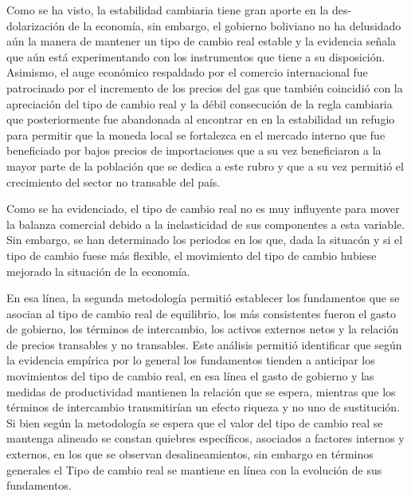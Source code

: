 \documentclass[12pt,letterpaper]{article}
\begin{document}
Como se ha visto, la estabilidad cambiaria tiene gran aporte en la des-dolarización de la economía, sin embargo, el gobierno boliviano no ha delusidado aún la manera de mantener un tipo de cambio real estable y la evidencia señala que aún está experimentando con los instrumentos que tiene a su disposición. Asimismo, el auge económico respaldado por el comercio internacional fue patrocinado por el incremento de los precios del gas que también coincidió con la apreciación del tipo de cambio real y la débil consecución de la regla cambiaria que posteriormente fue abandonada al encontrar en en la estabilidad un refugio para permitir que la moneda local se fortalezca en el mercado interno que fue beneficiado por bajos precios de importaciones que a su vez beneficiaron a la mayor parte de la población que se dedica a este rubro y que a su vez permitió el crecimiento del sector no transable del país.


Como se ha evidenciado, el tipo de cambio real no es muy influyente para mover la balanza comercial debido a la inelasticidad de sus componentes a esta variable. Sin embargo, se han determinado los periodos en los que, dada la situacón y si el tipo de cambio fuese más flexible, el movimiento del tipo de cambio hubiese mejorado la situación de la economía.



En esa línea, la segunda metodología permitió establecer los fundamentos que se asocian al tipo de cambio real de equilibrio, los más consistentes fueron el gasto de gobierno, los términos de intercambio, los activos externos netos y la relación de precios transables y no transables. Este análisis permitió identificar que según la evidencia empírica por lo general los fundamentos tienden a anticipar los movimientos del tipo de cambio real, en esa línea el gasto de gobierno y las medidas de productividad mantienen la relación que se espera, mientras que los términos de intercambio transmitirían un efecto riqueza y no uno de sustitución. Si bien según la metodología se espera que el valor del tipo de cambio real se mantenga alineado se constan quiebres específicos, asociados a factores internos y externos, en los que se observan desalineamientos, sin embargo en términos generales el Tipo de cambio real se mantiene en línea con la evolución de sus fundamentos. 
\end{document}
